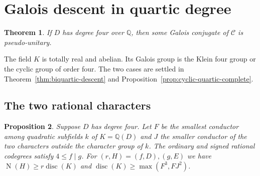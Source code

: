 \documentclass[11pt,a4paper]{article}
\newtheorem{theorem}{Theorem}[section]
\newtheorem{proposition}[theorem]{Proposition}
\numberwithin{equation}{section}
\begin{document}
\section{Galois descent in quartic degree}\label{sec:quartic}
\begin{theorem}\label{thm:quartic-full}
If $D$ has degree four over $\mathbb Q$, then some Galois conjugate of
$\mathcal C$ is pseudo-unitary.
\end{theorem}
The field $K$ is totally real and abelian. Its Galois group is the Klein four group or the cyclic group of order four. The two cases are settled in Theorem~\ref{thm:biquartic-descent} and Proposition~\ref{prop:cyclic-quartic-complete}.
\subsection{The two rational characters}
\begin{proposition}\label{prop:quartic-conductor}
Suppose $D$ has degree four. Let $F$ be the smallest conductor among quadratic subfields $k$ of $K=\mathbb Q(D)$ and $J$ the smaller conductor of the two characters outside the character group of $k$. The ordinary and signed rational codegrees satisfy $4\le f\mid g$. For $(r,H)=(f,D),(g,E)$ we have $\operatorname{N}(H)\ge r\operatorname{disc}(K)$ and $\operatorname{disc}(K)\ge\max(F^3,FJ^2)$.
\end{proposition}
\end{document}
